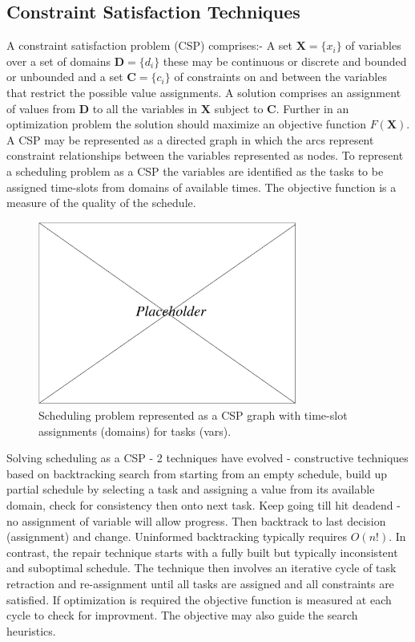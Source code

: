 \subsection{Constraint Satisfaction Techniques}

A constraint satisfaction problem (CSP) comprises:- A set $\mathbf{X} = \{x_i\}$ of variables over a set of domains $\mathbf{D} = \{d_i\}$ these may be continuous or discrete and bounded or unbounded and a set $\mathbf{C} = \{c_i\}$ of constraints on and between the variables that restrict the possible value assignments. A solution comprises an assignment of values from $\mathbf{D}$ to all the variables in $\mathbf{X}$ subject to $\mathbf{C}$. Further in an optimization problem the solution should maximize an objective function $F(\mathbf{X})$. A CSP may be represented as a directed graph in which the arcs represent constraint relationships between the variables represented as nodes. To represent a scheduling problem as a CSP the variables are identified as the tasks to be assigned time-slots from domains of available times. The objective function is a measure of the quality of the schedule.

   \begin{figure}[h]
   \begin{center}
   \includegraphics[height=6cm]{figures/placeholder.eps}
   \end{center}
   \label{fig:object} 
   \caption[Scheduling as a CSP.] 
   {Scheduling problem represented as a CSP graph with time-slot assignments (domains) for tasks (vars).}
   \end{figure} 


Solving scheduling as a CSP - 2 techniques have evolved - constructive techniques based on backtracking search from starting from an empty schedule, build up partial schedule by selecting a task and assigning a value from its available domain, check for consistency then onto next task. Keep going till hit deadend - no assignment of variable will allow progress. Then backtrack to last decision (assignment) and change. Uninformed backtracking typically requires $O(n!)$. In contrast, the repair technique starts with a fully built but typically inconsistent and suboptimal schedule. The technique then involves an iterative cycle of task retraction and re-assignment until all tasks are assigned and all constraints are satisfied. If optimization is required the objective function is measured at each cycle to check for improvment. The objective may also guide the search heuristics.



